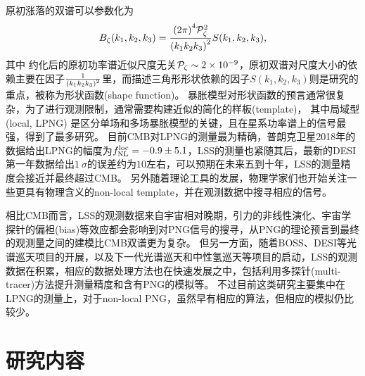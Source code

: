 原初涨落的双谱可以参数化为
\begin{equation}
    B_{\zeta}(k_1,k_2,k_3) = \frac{{(2\pi)}^4 \mathcal{P}_{\zeta}^2}{{\qty(k_1 k_2 k_3)}^2}  S(k_1,k_2,k_3),
\end{equation}
其中
约化后的原初功率谱近似尺度无关$\mathcal{P}_{\zeta}\sim 2\times 10^{-9}$，原初双谱对尺度大小的依赖主要在因子$\frac{1}{{\qty(k_1 k_2 k_3)}^2}$里，而描述三角形形状依赖的因子$S(k_1,k_2,k_3)$则是研究的重点，被称为形状函数(shape function)。
暴胀模型对形状函数的预言通常很复杂，为了进行观测限制，通常需要构建近似的简化的样板(template)，%
其中局域型(local, LPNG)%
是区分单场和多场暴胀模型的关键，且在星系功率谱上的信号最强，得到了最多研究。
目前CMB对LPNG的测量最为精确，普朗克卫星2018年的数据给出LPNG的幅度为$f_{\rm NL}^{\rm loc}=-0.9\pm 5.1$\cite{planck2020png}，LSS的测量也紧随其后，最新的DESI第一年数据给出$1~\sigma$的误差约为$10$左右\cite{chaussidon2024desipng}，可以预期在未来五到十年，LSS的测量精度会接近并最终超过CMB\cite{achucarro2022inflation,zhao2024must}。
另外随着理论工具的发展，物理学家们也开始关注一些更具有物理含义的non-local template，并在观测数据中搜寻相应的信号\cite{sohn2024CCCMB,cabass2024boss,green2024boss}。

相比CMB而言，LSS的观测数据来自宇宙相对晚期，引力的非线性演化、宇宙学探针的偏袒(bias)等效应都会影响到对PNG信号的搜寻，从PNG的理论预言到最终的观测量之间的建模比CMB双谱更为复杂。
但另一方面，随着BOSS、DESI等光谱巡天项目的开展，以及下一代光谱巡天和中性氢巡天等项目的启动，LSS的观测数据在积累，相应的数据处理方法也在快速发展之中，包括利用多探针(multi-tracer)方法提升测量精度\cite{barreira2023mtpng,sullivan2023mtpng}和含有PNG的模拟\cite{coulton2022quijotepng,adame2024unitpng,hadzhiyska2024abacuspng}等。
不过目前这类研究主要集中在LPNG的测量上，对于non-local PNG，虽然早有相应的算法\cite{scoccimarro2012nonlocalpng,wagner2010pshmf,regan2012uningic}，但相应的模拟\cite{coulton2022quijotepng,goldstein2024quijotecc}仍比较少。



\chapter{研究内容}
